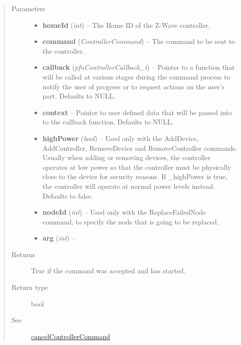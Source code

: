 \documentclass[letterpaper,10pt,english]{sphinxmanual}
\begin{document}
\begin{fulllineitems}
\begin{fulllineitems}
\begin{itemize}
\end{itemize}
\begin{quote}\begin{description}
\item[{Parameters}] \leavevmode\begin{itemize}
\item {} 
\textbf{homeId} (\emph{int}) -- The Home ID of the Z-Wave controller.

\item {} 
\textbf{command} (\emph{ControllerCommand}) -- The command to be sent to the controller.

\item {} 
\textbf{callback} (\emph{pfnControllerCallback\_t}) -- Pointer to a function that will be called at various stages during the command process to notify the user of progress or to request actions on the user's part.  Defaults to NULL.

\item {} 
\textbf{context} -- Pointer to user defined data that will be passed into to the callback function.  Defaults to NULL.

\item {} 
\textbf{highPower} (\emph{bool}) -- Used only with the AddDevice, AddController, RemoveDevice and RemoveController commands. Usually when adding or removing devices, the controller operates at low power so that the controller must be physically close to the device for security reasons.  If \_highPower is true, the controller will operate at normal power levels instead.  Defaults to false.

\item {} 
\textbf{nodeId} (\emph{int}) -- Used only with the ReplaceFailedNode command, to specify the node that is going to be replaced.

\item {} 
\textbf{arg} (\emph{int}) -- 

\end{itemize}

\item[{Returns}] \leavevmode
True if the command was accepted and has started.

\item[{Return type}] \leavevmode
bool

\item[{See}] \leavevmode
{\hyperref[libopenzwave:cancelcontrollercommand]{cancelControllerCommand}}

\end{description}\end{quote}


\end{fulllineitems}
\end{fulllineitems}
\end{document}
